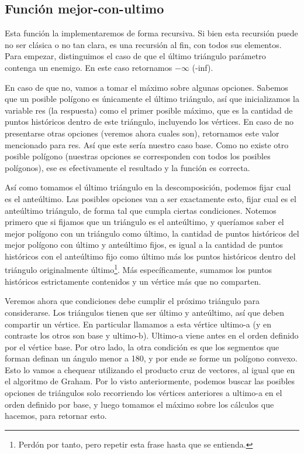 \subsection{Función mejor-con-ultimo}
\par{Esta función la implementaremos de forma recursiva. Si bien esta recursión puede no ser clásica o no tan clara, es una recursión al fin, con todos sus elementos.
Para empezar, distinguimos el caso de que el último triángulo parámetro contenga un enemigo. En este caso retornamos $-\infty$ (-inf). }
\par{En caso de que no, vamos a tomar el máximo sobre algunas opciones. Sabemos que un posible polígono es únicamente el último triángulo, así que inicializamos la variable res (la respuesta) como el primer posible máximo, que es la cantidad de puntos históricos dentro de este triángulo, incluyendo los vértices.
En caso de no presentarse otras opciones (veremos ahora cuales son), retornamos este valor mencionado para res. Así que este sería nuestro caso base. Como no existe otro posible polígono (nuestras opciones se corresponden con todos los posibles polígonos), ese es efectivamente el resultado y la función es correcta.}
\par{
Así como tomamos el último triángulo en la descomposición, podemos fijar cual es el anteúltimo.
Las posibles opciones van a ser exactamente esto, fijar cual es el anteúltimo triángulo, de forma tal que cumpla ciertas condiciones.
Notemos primero que si fijamos que un triángulo es el anteúltimo, y queríamos saber el mejor polígono con un triángulo como último, la cantidad de puntos históricos del mejor polígono con último y anteúltimo fijos, es igual a la cantidad de puntos históricos con el anteúltimo fijo como último más los puntos históricos dentro del triángulo originalmente último\footnote{Perdón por tanto, pero repetir esta frase hasta que se entienda.}. Más específicamente, sumamos los puntos históricos estrictamente contenidos y un vértice más que no comparten.
}
\par{Veremos ahora que condiciones debe cumplir el próximo triángulo para considerarse. Los triángulos tienen que ser último y anteúltimo, así que deben compartir un vértice. En particular llamamos a esta vértice ultimo-a (y en contraste los otros son base y ultimo-b). Ultimo-a viene antes en el orden definido por el vértice base. Por otro lado, la otra condición es que los segmentos que forman definan un ángulo menor a 180, y por ende se forme un polígono convexo. Esto lo vamos a chequear utilizando el producto cruz de vectores, al igual que en el algoritmo de Graham. 
Por lo visto anteriormente, podemos buscar las posibles opciones de triángulos solo recorriendo los vértices anteriores a ultimo-a en el orden definido por base, y luego tomamos el máximo sobre los cálculos que hacemos, para retornar esto.}


